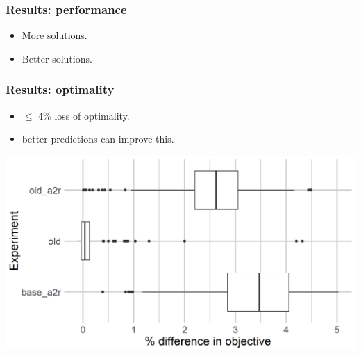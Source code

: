 \begin{frame}
\frametitle{\textbf{Results: performance}}

  \begin{itemize}[<+->]
    \item More solutions.
    \item Better solutions.
  \end{itemize}

\end{frame}

\begin{frame}
\frametitle{\textbf{Results: optimality}}

  \begin{itemize}[<+->]
    \item $\le$ 4\% loss of optimality.
    \item better predictions can improve this.
  \end{itemize}

  \includegraphics[width=0.8\linewidth]{images/quality_degradation_2tasks}

\end{frame}

